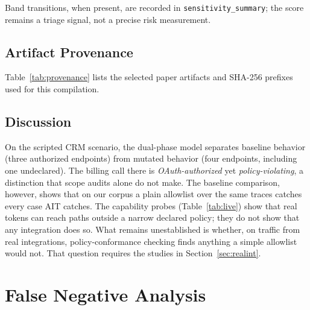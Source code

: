 \documentclass[conference]{IEEEtran}
\begin{document}
\begin{table}[htbp]
  \caption{Risk Score Sensitivity ($\pm30\%$ Weight Variation;
  selected CRM scenarios from offline artifacts)}
  \label{tab:sensitivity}
  \centering
  \renewcommand{\arraystretch}{1.25}
  \footnotesize
  \resizebox{\columnwidth}{!}{}
\end{table}

Band transitions, when present, are recorded in
\texttt{sensitivity\_summary}; the score remains a triage signal, not a
precise risk measurement.

\subsection{Artifact Provenance}

Table~\ref{tab:provenance} lists the selected paper artifacts and
SHA-256 prefixes used for this compilation.

\begin{table}[htbp]
  \caption{Selected Artifact Provenance}
  \label{tab:provenance}
  \centering
  \renewcommand{\arraystretch}{1.2}
  \footnotesize
  \resizebox{\textwidth}{!}{}
\end{table}

\subsection{Discussion}

On the scripted CRM scenario, the dual-phase model separates baseline
behavior (three authorized endpoints) from mutated behavior (four
endpoints, including one undeclared). The billing call there is
\emph{OAuth-authorized} yet \emph{policy-violating}, a distinction that
scope audits alone do not make. The baseline comparison, however, shows
that on our corpus a plain allowlist over the same traces catches every
case AIT catches. The capability probes (Table~\ref{tab:live}) show that
real tokens can reach paths outside a narrow declared policy; they do not
show that any integration does so. What remains unestablished is
whether, on traffic from real integrations, policy-conformance checking
finds anything a simple allowlist would not. That question requires the
studies in Section~\ref{sec:realint}.

\section{False Negative Analysis}
\label{sec:fn}
\end{document}
